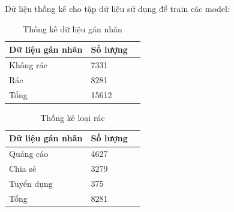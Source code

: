 Dữ liệu thống kê cho tập dữ liệu sử dụng để train các model:
	\begin{table}[H]
		\centering
		\setlength\extrarowheight{3pt}
		\begin{tabular}{|l|l|l|}
			\hline
			Dữ liệu gán nhãn & Số lượng \\
			\hline
			Không rác   & 7331\\
			\hline
			Rác   & 8281\\
			\hline
			\hline
			Tổng   & 15612\\
			\hline
		\end{tabular}%
		\caption{Thống kê dữ liệu gán nhãn} \label{tab:table_4_1}%
	\end{table}
	\begin{table}[H]
		\centering
		\setlength\extrarowheight{3pt}
		\begin{tabular}{|l|l|l|}
			\hline
			Dữ liệu gán nhãn & Số lượng \\
			\hline
			Quảng cáo   & 4627\\
			\hline
			Chia sẻ   & 3279\\
			\hline
			Tuyển dụng   & 375\\
			\hline
			\hline
			Tổng   & 8281\\
			\hline
		\end{tabular}%
		\caption{Thống kê loại rác} \label{tab:table_4_2}%
	\end{table}

